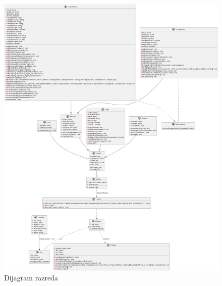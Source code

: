 	        \begin{figure}[H]
			\includegraphics[scale=0.2]{slike/DijagramRazreda.png}
			\centering
			\caption{Dijagram razreda}
			\label{fig:promjene}
		          \end{figure}
			
			
			
			
			
		
			
			
			
			
